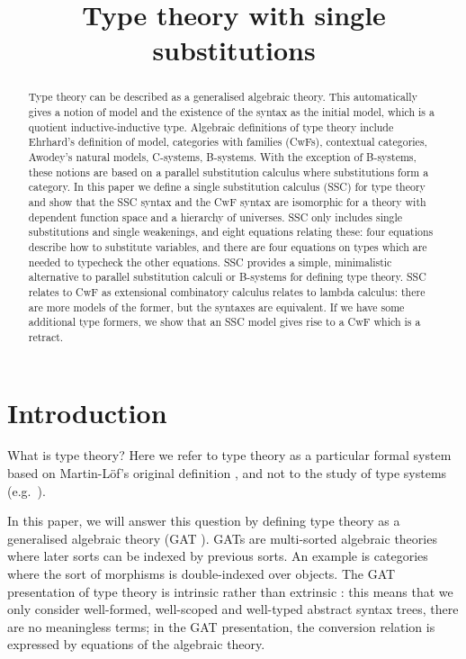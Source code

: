 \documentclass[a4paper,UKenglish]{article}
\title{Type theory with single substitutions}
\begin{document}
\maketitle

\begin{abstract}
Type theory can be described as a generalised algebraic theory. This
automatically gives a notion of model and the existence of the syntax
as the initial model, which is a quotient inductive-inductive
type. Algebraic definitions of type theory include Ehrhard's
definition of model, categories with families (CwFs), contextual
categories, Awodey's natural models, C-systems, B-systems. With the
exception of B-systems, these notions are based on a parallel
substitution calculus where substitutions form a category. In this
paper we define a single substitution calculus (SSC) for type theory
and show that the SSC syntax and the CwF syntax are isomorphic for a
theory with dependent function space and a hierarchy of universes. SSC
only includes single substitutions and single weakenings, and eight
equations relating these: four equations describe how to substitute
variables, and there are four equations on types which are needed to
typecheck the other equations. SSC provides a simple, minimalistic
alternative to parallel substitution calculi or B-systems for defining
type theory. SSC relates to CwF as extensional combinatory calculus
relates to lambda calculus: there are more models of the former, but
the syntaxes are equivalent. If we have some additional type formers,
we show that an SSC model gives rise to a CwF which is a retract.
\end{abstract}

\section{Introduction}

What is type theory? Here we refer to type theory as a particular
formal system based on Martin-Löf's original definition
\cite{martinlof73predicative}, and not to the study of type systems
(e.g.\ \cite{DBLP:books/daglib/0005958}).

In this paper, we will answer this question by defining type theory as
a generalised algebraic theory (GAT
\cite{DBLP:journals/apal/Cartmell86}). GATs are multi-sorted algebraic
theories where later sorts can be indexed by previous sorts. An
example is categories where the sort of morphisms is double-indexed
over objects.
%
The GAT presentation of type theory is intrinsic
\cite{DBLP:conf/csl/AltenkirchR99,DBLP:conf/popl/AltenkirchK16} rather
than extrinsic
\cite{alti:phd93,abel2013normalization,DBLP:conf/cpp/AdjedjLMPP24}:
this means that we only consider well-formed, well-scoped and
well-typed abstract syntax trees, there are no meaningless terms; in
the GAT presentation, the conversion relation is expressed by
equations of the algebraic theory.
\end{document}
